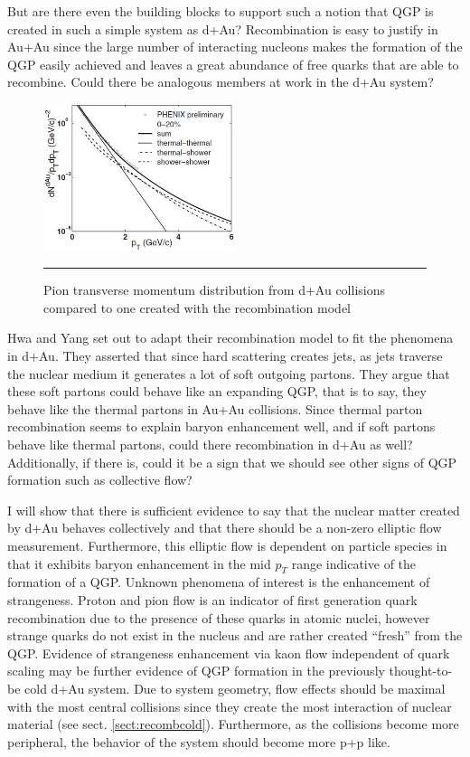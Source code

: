 But are there even the building blocks to support such a notion that QGP is created in such a simple system as d+Au? Recombination is easy to justify in Au+Au since the large number of interacting nucleons makes the formation of the QGP easily achieved and leaves a great abundance of free quarks that are able to recombine. Could there be analogous members at work in the d+Au system? 
\begin{figure}[b!]
  \centering
    \includegraphics[width=0.5\textwidth]{prevplots/daurecomb.JPG}
    \rule{35em}{0.5pt}
  \caption[Pion transverse momentum distribution from d+Au collisions compared to one created with the recombination model]{Pion transverse momentum distribution from d+Au collisions compared to one created with the recombination model}
  \label{fig:daaaratios}
\end{figure}
Hwa and Yang set out to adapt their recombination model to fit the phenomena in d+Au\citep{PhysRevLett.93.082302}. They asserted that since hard scattering creates jets, as jets traverse the nuclear medium it generates a lot of soft outgoing partons. They argue that these soft partons could behave like an expanding QGP, that is to say, they behave like the thermal partons in Au+Au collisions. Since thermal parton recombination seems to explain baryon enhancement well, and if soft partons behave like thermal partons, could there recombination in d+Au as well? Additionally, if there is, could it be a sign that we should see other signs of QGP formation such as collective flow? 

I will show that there is sufficient evidence to say that the nuclear matter created by d+Au behaves collectively and that there should be a non-zero elliptic flow measurement. Furthermore, this elliptic flow is dependent on particle species in that it exhibits baryon enhancement in the mid $p_T$ range indicative of the formation of a QGP. Unknown phenomena of interest is the enhancement of strangeness. Proton and pion flow is an indicator of first generation quark recombination due to the presence of these quarks in atomic nuclei, however strange quarks do not exist in the nucleus and are rather created ``fresh'' from the QGP.  Evidence of strangeness enhancement via kaon flow independent of quark scaling may be further evidence of QGP formation in the previously thought-to-be cold d+Au system. Due to system geometry, flow effects should be maximal with the most central collisions since they create the most interaction of nuclear material (see sect. \ref{sect:recombcold}). Furthermore, as the collisions become more peripheral, the behavior of the system should become more p+p like.
\pagebreak
\pagebreak
